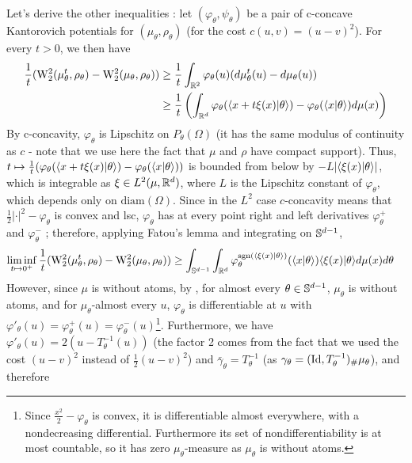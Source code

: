 Let's derive the other inequalities : let $(\varphi_\theta, \psi_\theta)$ be a pair of c-concave Kantorovich potentials for $(\mu_\theta,\rho_\theta)$ (for the cost $c(u,v) = (u-v)^2$). For every $t > 0$, we then have 
\begin{align}
    \frac{1}{t} (\mathrm{W}^2_2(\mu^t_\theta,\rho_\theta) - \mathrm{W}^2_2(\mu_\theta,\rho_\theta)) 
    &\geq \frac{1}{t} \int_{\mathbb R^2} \varphi_\theta(u) (d\mu^t_\theta(u) - d\mu_\theta(u)) \\
    &\geq \frac{1}{t} \left( \int_{\mathbb R^d} \varphi_\theta(\langle x + t\xi(x)|\theta\rangle) - \varphi_\theta(\langle x|\theta\rangle) d\mu(x) \right) 
\end{align}
By c-concavity, $\varphi_\theta$ is Lipschitz on $P_\theta(\Omega)$ (it has the same modulus of continuity as $c$ - note that we use here the fact that $\mu$ and $\rho$ have compact support). Thus, $t \mapsto \frac{1}{t}(\varphi_\theta(\langle x + t\xi(x)|\theta\rangle) - \varphi_\theta(\langle x|\theta\rangle))$ is bounded from below by $-L|\langle\xi(x)|\theta\rangle|$, which is integrable as $\xi \in L^2(\mu,\mathbb R^d)$, where $L$ is the Lipschitz constant of $\varphi_\theta$, which depends only on $\mathrm{diam}(\Omega)$. Since in the $L^2$ case $c$-concavity means that $\frac{1}{2}|\cdot|^2 - \varphi_\theta$ is convex and lsc, $\varphi_\theta$ has at every point right and left derivatives $\varphi_\theta^+$ and $\varphi_\theta^-$ ; therefore, applying Fatou's lemma and integrating on $\mathbb S^{d-1}$,
\begin{align}
    \liminf_{t \mapsto 0^+} \frac{1}{t} (\mathrm{W}^2_2(\mu^t_\theta,\rho_\theta) - \mathrm{W}^2_2(\mu_\theta,\rho_\theta)) 
    &\geq \int_{\mathbb S^{d-1}} \int_{\mathbb R^d} \varphi^{\mathrm{sgn}(\langle\xi(x)|\theta\rangle)}_\theta(\langle x|\theta\rangle)\langle\xi(x)|\theta\rangle d\mu(x) d\theta 
\end{align}
However, since $\mu$ is without atoms, by , for almost every $\theta \in\mathbb S^{d-1}$, $\mu_\theta$ is without atoms, and for %
$\mu_\theta$-almost every $u$, $\varphi_\theta$ is differentiable at $u$ with $\varphi'_\theta(u) = \varphi_\theta^+(u) = \varphi_\theta^-(u)$\footnote{Since $\frac{x^2}{2} - \varphi_\theta$ is convex, it is differentiable almost everywhere, with a nondecreasing differential. Furthermore its set of nondifferentiability is at most countable, so it has zero $\mu_\theta$-measure as $\mu_\theta$ is without atoms.}. Furthermore, we have $\varphi'_\theta(u) = 2(u - T^{-1}_\theta(u))$ (the factor 2 comes from the fact that we used the cost $(u-v)^2$ instead of $\frac{1}{2}(u-v)^2$) and $\bar{\gamma}_\theta = T^{-1}_\theta$ (as $\gamma_\theta = (\mathop{\mathrm{Id}}\nolimits,T^{-1}_\theta)_\#\mu_\theta$), and therefore
